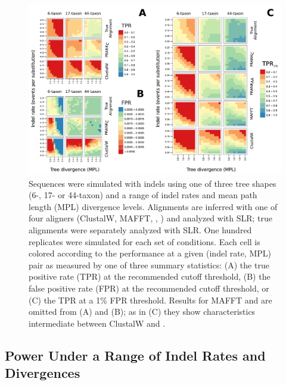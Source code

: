 \begin{figure}[t!]
\centering
\includegraphics[scale=0.8]{Figs/fig4.pdf}
\caption{Sequences were simulated with indels using one of three tree
  shapes (6-, 17- or 44-taxon) and a range of indel rates and mean
  path length (MPL) divergence levels. Alignments are inferred with
  one of four aligners (ClustalW, MAFFT, \pranka{}, \prankc) and
  analyzed with SLR; true alignments were separately analyzed with
  SLR. One hundred replicates were simulated for each set of
  conditions. Each cell is colored according to the performance at a
  given (indel rate, MPL) pair as measured by one of three summary
  statistics: (A) the true positive rate (TPR) at the recommended
  cutoff threshold, (B) the false positive rate (FPR) at the
  recommended cutoff threshold, or (C) the TPR at a 1\% FPR
  threshold. Results for MAFFT and \pranka are omitted from (A) and
  (B); as in (C) they show characteristics intermediate between
  ClustalW and \prankc.}
\label{fig_4}
\end{figure}

\subsection{\Sw Power Under a Range of Indel Rates and Divergences}

